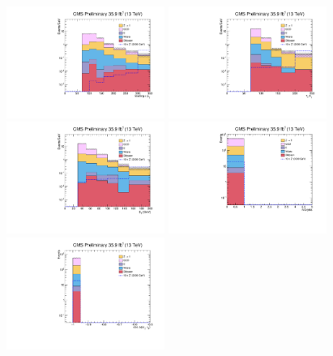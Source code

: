 \begin{figure}[H]
 \begin{center}
 \captionsetup[subfloat]{farskip=0pt,captionskip=0.0cm,labelformat=empty}
 \includegraphics[clip,width=0.46\textwidth]{figuras/Chapter5/SR_Plots/leadtau_pt.pdf}
 \includegraphics[clip,width=0.46\textwidth]{figuras/Chapter5/SR_Plots/tau2_pt.pdf} \hfill
 \includegraphics[clip,width=0.46\textwidth]{figuras/Chapter5/SR_Plots/MET.pdf}
 \includegraphics[clip,width=0.46\textwidth]{figuras/Chapter5/SR_Plots/NBJets.pdf}\hfill
 \includegraphics[clip,width=0.46\textwidth]{figuras/Chapter5/SR_Plots/cosDPhi.pdf}

\end{center}
\end{figure}
